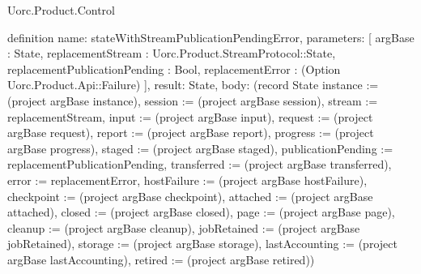 \begin{lexlean}{Uorc.Product.Control}
\begin{semanticmodule}
definition{
  name: stateWithStreamPublicationPendingError,
  parameters: [
    argBase : State,
    replacementStream : Uorc.Product.StreamProtocol::State,
    replacementPublicationPending : Bool,
    replacementError : (Option Uorc.Product.Api::Failure)
  ],
  result: State,
  body: (record State {instance := (project argBase instance), session := (project argBase session), stream := replacementStream, input := (project argBase input), request := (project argBase request), report := (project argBase report), progress := (project argBase progress), staged := (project argBase staged), publicationPending := replacementPublicationPending, transferred := (project argBase transferred), error := replacementError, hostFailure := (project argBase hostFailure), checkpoint := (project argBase checkpoint), attached := (project argBase attached), closed := (project argBase closed), page := (project argBase page), cleanup := (project argBase cleanup), jobRetained := (project argBase jobRetained), storage := (project argBase storage), lastAccounting := (project argBase lastAccounting), retired := (project argBase retired)})
}


\end{semanticmodule}
\end{lexlean}
